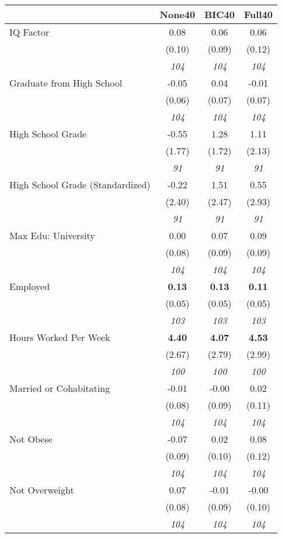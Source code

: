 \begin{tabular}{l c c c}
\toprule
 & None40 & BIC40 & Full40 \\
\midrule
IQ Factor & 0.08 & 0.06 & 0.06 \\
& (0.10) & (0.09) & (0.12) \\
& \textit{ 104 } & \textit{ 104 } & \textit{ 104 } \\
Graduate from High School & -0.05 & 0.04 & -0.01 \\
& (0.06) & (0.07) & (0.07) \\
& \textit{ 104 } & \textit{ 104 } & \textit{ 104 } \\
High School Grade & -0.55 & 1.28 & 1.11 \\
& (1.77) & (1.72) & (2.13) \\
& \textit{ 91 } & \textit{ 91 } & \textit{ 91 } \\
High School Grade (Standardized) & -0.22 & 1.51 & 0.55 \\
& (2.40) & (2.47) & (2.93) \\
& \textit{ 91 } & \textit{ 91 } & \textit{ 91 } \\
Max Edu: University & 0.00 & 0.07 & 0.09 \\
& (0.08) & (0.09) & (0.09) \\
& \textit{ 104 } & \textit{ 104 } & \textit{ 104 } \\
Employed & \textbf{ 0.13 } & \textbf{ 0.13 } & \textbf{ 0.11 } \\
& (0.05) & (0.05) & (0.05) \\
& \textit{ 103 } & \textit{ 103 } & \textit{ 103 } \\
Hours Worked Per Week & \textbf{ 4.40 } & \textbf{ 4.07 } & \textbf{ 4.53 } \\
& (2.67) & (2.79) & (2.99) \\
& \textit{ 100 } & \textit{ 100 } & \textit{ 100 } \\
Married or Cohabitating & -0.01 & -0.00 & 0.02 \\
& (0.08) & (0.09) & (0.11) \\
& \textit{ 104 } & \textit{ 104 } & \textit{ 104 } \\
Not Obese & -0.07 & 0.02 & 0.08 \\
& (0.09) & (0.10) & (0.12) \\
& \textit{ 104 } & \textit{ 104 } & \textit{ 104 } \\
Not Overweight & 0.07 & -0.01 & -0.00 \\
& (0.08) & (0.09) & (0.10) \\
& \textit{ 104 } & \textit{ 104 } & \textit{ 104 } \\

\end{tabular}
